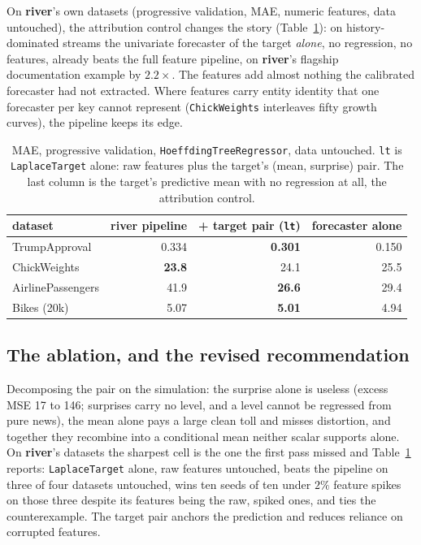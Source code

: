 \documentclass[article]{jss}
\providecommand{\pkg}[1]{\textbf{#1}}
\providecommand{\code}[1]{\texttt{#1}}
\theoremstyle{remark}
\begin{document}
On \pkg{river}'s own datasets (progressive validation, MAE, numeric features,
data untouched), the attribution control changes the story
(Table~\ref{tab:river}): on history-dominated streams the univariate
forecaster of the target \emph{alone}, no regression, no features, already
beats the full feature pipeline, on \pkg{river}'s flagship documentation
example by $2.2\times$. The features add almost nothing the calibrated
forecaster had not extracted. Where features carry entity identity that one
forecaster per key cannot represent (\code{ChickWeights} interleaves fifty
growth curves), the pipeline keeps its edge.

\begin{table}[t]
\centering
\begin{tabular}{lrrr}
\toprule
dataset & \pkg{river} pipeline & + target pair (\code{lt}) & forecaster alone \\
\midrule
TrumpApproval     & 0.334 & \textbf{0.301} & 0.150 \\
ChickWeights      & \textbf{23.8} & 24.1 & 25.5 \\
AirlinePassengers & 41.9 & \textbf{26.6} & 29.4 \\
Bikes (20k)       & 5.07 & \textbf{5.01} & 4.94 \\
\bottomrule
\end{tabular}
\caption{MAE, progressive validation, \code{HoeffdingTreeRegressor}, data
untouched. \code{lt} is \code{LaplaceTarget} alone: raw features plus the
target's (mean, surprise) pair. The last column is the target's predictive
mean with no regression at all, the attribution control.}
\label{tab:river}
\end{table}

\subsection{The ablation, and the revised recommendation}

Decomposing the pair on the simulation: the surprise alone is useless (excess
MSE 17 to 146; surprises carry no level, and a level cannot be regressed from
pure news), the mean alone pays a large clean toll and misses distortion, and
together they recombine into a conditional mean neither scalar supports
alone. On \pkg{river}'s datasets the sharpest cell is the one the first pass
missed and Table~\ref{tab:river} reports: \code{LaplaceTarget} alone, raw
features untouched, beats the pipeline on three of four datasets untouched,
wins ten seeds of ten under $2\%$ feature spikes on those three despite its
features being the raw, spiked ones, and ties the counterexample. The target
pair anchors the prediction and reduces reliance on corrupted features.
\end{document}
